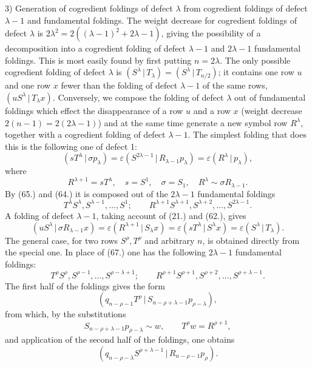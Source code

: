\documentclass[11pt]{article}
\providecommand{\pair}[2]{(#1\,|\,#2)}
\providecommand{\eps}{\varepsilon}
\begin{document}
3) Generation of cogredient foldings of defect $\lambda$ from cogredient foldings of defect $\lambda-1$ and fundamental foldings. The weight decrease for cogredient foldings of defect $\lambda$ is $2\lambda^2=2((\lambda-1)^2+2\lambda-1)$, giving the possibility of a decomposition into a cogredient folding of defect $\lambda-1$ and $2\lambda-1$ fundamental foldings. This is most easily found by first putting $n=2\lambda$. The only possible cogredient folding of defect $\lambda$ is $\pair{S^\lambda}{T_\lambda}=\pair{S^\lambda}{T_{n/2}}$; it contains one row $u$ and one row $x$ fewer than the folding of defect $\lambda-1$ of the same rows, $\pair{uS^\lambda}{T_\lambda x}$. Conversely, we compose the folding of defect $\lambda$ out of fundamental foldings which effect the disappearance of a row $u$ and a row $x$ (weight decrease $2(n-1)=2(2\lambda-1)$) and at the same time generate a new symbol row $R^\lambda$, together with a cogredient folding of defect $\lambda-1$. The simplest folding that does this is the following one of defect 1:
\[
 \pair{sT^\lambda}{\sigma p_\lambda}=\eps\pair{S^{2\lambda-1}}{R_{\lambda-1}p_\lambda}=\eps\pair{R^\lambda}{p_\lambda},
\]
where
\[
 R^{\lambda+1}=sT^\lambda,
 \quad s=S^1,
 \quad \sigma=S_1,
 \quad R^\lambda\sim\sigma R_{\lambda-1}.
\]
By (65.) and (64.) it is composed out of the $2\lambda-1$ fundamental foldings
\begin{equation}
 T^\lambda S^\lambda,S^{\lambda-1},\ldots,S^1;
 \qquad R^{\lambda+1}S^{\lambda+1},S^{\lambda+2},\ldots,S^{2\lambda-1}.
\tag{67}
\end{equation}
A folding of defect $\lambda-1$, taking account of (21.) and (62.), gives
\[
 \pair{uS^\lambda}{\sigma R_{\lambda-1}x}=\eps\pair{R^{\lambda+1}}{S_\lambda x}
 =\eps\pair{sT^\lambda}{S^\lambda x}=\eps\pair{S^\lambda}{T_\lambda}.
\]
The general case, for two rows $S^\rho,T^\rho$ and arbitrary $n$, is obtained directly from the special one. In place of (67.) one has the following $2\lambda-1$ fundamental foldings:
\begin{equation}
 T^\rho S^\rho,S^{\rho-1},\ldots,S^{\rho-\lambda+1};
 \qquad R^{\rho+1}S^{\rho+1},S^{\rho+2},\ldots,S^{\rho+\lambda-1}.
\tag{68}
\end{equation}
The first half of the foldings gives the form
\[
 \pair{q_{n-\rho-1}T^\rho}{S_{n-\rho+\lambda-1}p_{\rho-\lambda}},
\]
from which, by the substitutions
\[
 S_{n-\rho+\lambda-1}p_{\rho-\lambda}\sim w,
 \qquad T^\rho w=R^{\rho+1},
\]
and application of the second half of the foldings, one obtains
\[
 \pair{q_{n-\rho-\lambda}S^{\rho+\lambda-1}}{R_{n-\rho-1}p_\rho}.
\]
\end{document}
